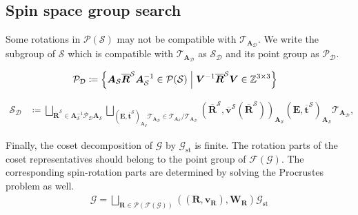 \subsection{Spin space group search}

Some rotations in $\mathcal{P}(\mathcal{S})$ may not be compatible with $\mathcal{T}_{\bm{A}_{\mathcal{D}}}$.
We write the subgroup of $\mathcal{S}$ which is compatible with $\mathcal{T}_{\bm{A}_{\mathcal{D}}}$ as $\mathcal{S}_{\mathcal{D}}$ and its point group as $\mathcal{P}_{\mathcal{D}}$.

\begin{align}
  \mathcal{P}_{\mathcal{D}}
    &\coloneqq \left\{ 
        \bm{A}_{\mathcal{S}} \overline{\bm{R}}^{\mathcal{S}} \bm{A}_{\mathcal{S}}^{-1} \in \mathcal{P}(\mathcal{S})
       \mathrel{}\middle|\mathrel{} 
        \bm{V}^{-1} \overline{\bm{R}}^{\mathcal{S}} \bm{V} \in \mathbb{Z}^{3 \times 3}
       \right\}
\end{align}

\begin{align}
  \mathcal{S}_{\mathcal{D}}
    &\coloneqq \bigsqcup_{
          \overline{\bm{R}}^{\mathcal{S}} \in \bm{A}_{\mathcal{S}}^{-1} \mathcal{P}_{\mathcal{D}} \bm{A}_{\mathcal{S}}
      } \bigsqcup_{
          \left( \bm{E}, \overline{ \bm{t} }^{\mathcal{S}} \right)_{ \bm{A}_{\mathcal{S}} } \mathcal{T}_{\bm{A}_{\mathcal{D}}}
          \in \mathcal{T}_{\bm{A}_{\mathcal{S}}} / \mathcal{T}_{\bm{A}_{\mathcal{D}}}
      }
      \left(
        \overline{\bm{R}}^{\mathcal{S}},
        \overline{ \bm{v} }^{\mathcal{S}}(\overline{\bm{R}}^{\mathcal{S}})
      \right)_{ \bm{A}_{\mathcal{S}} }
      \left( \bm{E}, \overline{ \bm{t} }^{\mathcal{S}} \right)_{ \bm{A}_{\mathcal{S}} }
      \mathcal{T}_{\bm{A}_{\mathcal{D}}},
\end{align}

Finally, the coset decomposition of $\mathcal{G}$ by $\mathcal{G}_{\mathrm{st}}$ is finite.
The rotation parts of the coset representatives should belong to the point group of $\mathcal{F}(\mathcal{G})$.
The corresponding spin-rotation parts are determined by solving the Procrustes problem as well.
\begin{align}
  \mathcal{G}
    = \bigsqcup_{ \bm{R} \in \mathcal{P}(\mathcal{F}(\mathcal{G})) } ((\bm{R}, \bm{v}_{\bm{R}}), \bm{W}_{\bm{R}}) \mathcal{G}_{\mathrm{st}}
\end{align}
